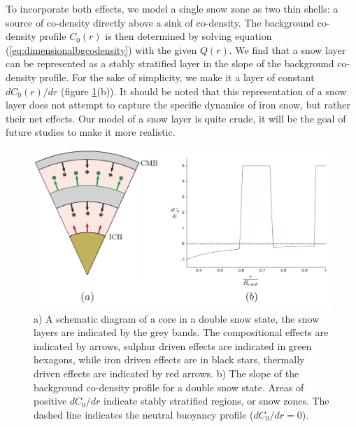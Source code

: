 To incorporate both effects, we model a single snow zone as two thin shells: a source of co-density directly above a sink of co-density. The background co-density profile $C_{0}\left(r\right)$ is then determined by solving equation (\ref{eq:dimensionalbgcodensity}) with the given $Q\left(r\right)$. We find that a snow layer can be represented as a stably stratified layer in the slope of the background co-density profile. For the sake of simplicity, we make it a layer of constant $d C_{0}\left(r\right)/dr$ (figure \ref{fig:setup}(b)). It should be noted that this representation of a snow layer does not attempt to capture the specific dynamics of iron snow, but rather their net effects. Our model of a snow layer is quite crude, it will be the goal of future studies to make it more realistic.
\begin{figure}
	\centering
	\noindent\includegraphics[width=40pc]{Chapter4/figures/setup.pdf}
	\caption{a) A schematic diagram of a core in a double snow state, the snow layers are indicated by the grey bands. The compositional effects are indicated by arrows, sulphur driven effects are indicated in green hexagons, while iron driven effects are in black stars, thermally driven effects are indicated by red arrows. b) The slope of the background co-density profile for a double snow state. Areas of positive $dC_{0}/dr$ indicate stably stratified regions, or snow zones. The dashed line indicates the neutral buoyancy profile ($dC_{0}/dr=0$).}
	\label{fig:setup}
\end{figure}

